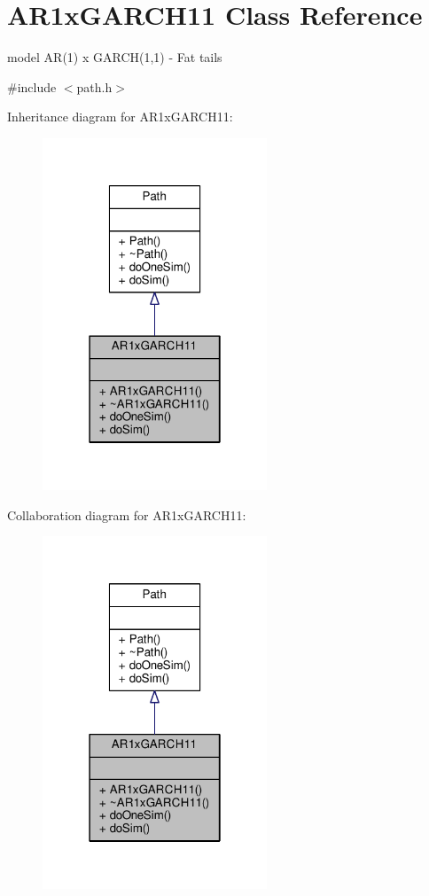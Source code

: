\hypertarget{classAR1xGARCH11}{}\section{A\+R1x\+G\+A\+R\+C\+H11 Class Reference}
\label{classAR1xGARCH11}


model A\+R(1) x G\+A\+R\+C\+H(1,1) -\/ Fat tails  




{\ttfamily \#include $<$path.\+h$>$}



Inheritance diagram for A\+R1x\+G\+A\+R\+C\+H11\+:
\nopagebreak
\begin{figure}[H]
\begin{center}
\leavevmode
\includegraphics[width=190pt]{classAR1xGARCH11__inherit__graph}
\end{center}
\end{figure}


Collaboration diagram for A\+R1x\+G\+A\+R\+C\+H11\+:
\nopagebreak
\begin{figure}[H]
\begin{center}
\leavevmode
\includegraphics[width=190pt]{classAR1xGARCH11__coll__graph}
\end{center}
\end{figure}
